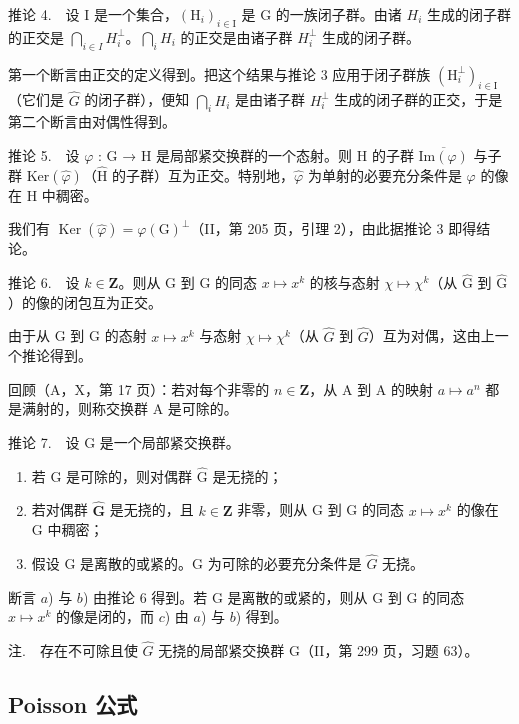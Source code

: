 推论 4.　设 I 是一个集合，\((\mathrm{H}_{i})_{i\in\mathrm{I}}\) 是 G 的一族闭子群。由诸 \(H_{i}\) 生成的闭子群的正交是 \(\bigcap_{i\in I}H_{i}^{\perp}\)。\(\bigcap_{i}H_{i}\) 的正交是由诸子群 \(H_{i}^{\perp}\) 生成的闭子群。

第一个断言由正交的定义得到。把这个结果与推论 3 应用于闭子群族 \((\mathrm{H}_{i}^{\perp})_{i\in\mathrm{I}}\)（它们是 \(\widehat{G}\) 的闭子群），便知 \(\bigcap_{i}H_{i}\) 是由诸子群 \(H_{i}^{\perp}\) 生成的闭子群的正交，于是第二个断言由对偶性得到。

推论 5.　设 \(\varphi\) : G → H 是局部紧交换群的一个态射。则 H 的子群 \(\overline{\text{Im}(\varphi)}\) 与子群 \(\text{Ker}(\widehat{\varphi})\)（\(\widehat{\text{H}}\) 的子群）互为正交。特别地，\(\widehat{\varphi}\) 为单射的必要充分条件是 \(\varphi\) 的像在 H 中稠密。

我们有 \(\operatorname{Ker}(\widehat{\varphi}) = \varphi(\mathrm{G})^{\perp}\)（II，第 205 页，引理 2），由此据推论 3 即得结论。

推论 6.　设 \(k \in \mathbf{Z}\)。则从 G 到 G 的同态 \(x \mapsto x^k\) 的核与态射 \(\chi \mapsto \chi^k\)（从 \(\widehat{\mathrm{G}}\) 到 \(\widehat{\mathrm{G}}\)）的像的闭包互为正交。

由于从 G 到 G 的态射 \(x \mapsto x^{k}\) 与态射 \(\chi \mapsto \chi^{k}\)（从 \(\widehat{G}\) 到 \(\widehat{G}\)）互为对偶，这由上一个推论得到。

回顾（A，X，第 17 页）：若对每个非零的 \(n \in \mathbf{Z}\)，从 A 到 A 的映射 \(a \mapsto a^n\) 都是满射的，则称交换群 A 是可除的。

推论 7.　设 G 是一个局部紧交换群。

\begin{enumerate}
\def\labelenumi{\alph{enumi})}
\item
  若 G 是可除的，则对偶群 \(\widehat{\mathrm{G}}\) 是无挠的；
\item
  若对偶群 \(\widehat{\mathbf{G}}\) 是无挠的，且 \(k\in\mathbf{Z}\) 非零，则从 G 到 G 的同态 \(x\mapsto x^{k}\) 的像在 G 中稠密；
\item
  假设 G 是离散的或紧的。G 为可除的必要充分条件是 \(\widehat{G}\) 无挠。
\end{enumerate}

断言 \(a\)) 与 \(b\)) 由推论 6 得到。若 G 是离散的或紧的，则从 G 到 G 的同态 \(x \mapsto x^k\) 的像是闭的，而 \(c\)) 由 \(a\)) 与 \(b\)) 得到。

注.　存在不可除且使 \(\widehat{G}\) 无挠的局部紧交换群 G（II，第 299 页，习题 63）。

\subsection{Poisson 公式}

